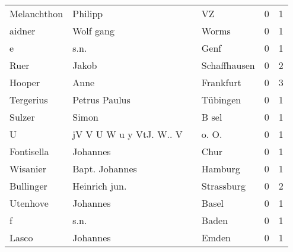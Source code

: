 \begin{center}
\begin{tiny}
\begin{longtabu}{llllrr}
              Melanchthon &                            Philipp &             &                                          VZ &          0 &         1 \\
                   aidner &                          Wolf gang &             &                                       Worms &          0 &         1 \\
                        e &                               s.n. &             &                                        Genf &          0 &         1 \\
                     Ruer &                              Jakob &             &                                Schaffhausen &          0 &         2 \\
                   Hooper &                               Anne &             &                                   Frankfurt &          0 &         3 \\
                Tergerius &                      Petrus Paulus &             &                                    Tübingen &          0 &         1 \\
                   Sulzer &                              Simon &             &                                       B sel &          0 &         1 \\
                        U &            jV V U W u y VtJ. W.. V &             &                                      o. O.  &          0 &         1 \\
               Fontisella &                           Johannes &             &                                        Chur &          0 &         1 \\
                 Wisanier &                     Bapt. Johannes &             &                                     Hamburg &          0 &         1 \\
                Bullinger &                      Heinrich jun. &             &                                  Strassburg &          0 &         2 \\
                 Utenhove &                           Johannes &             &                                       Basel &          0 &         1 \\
                        f &                               s.n. &             &                                       Baden &          0 &         1 \\
                    Lasco &                           Johannes &             &                                       Emden &          0 &         1 \\

\end{longtabu}
\end{tiny}
\end{center}
